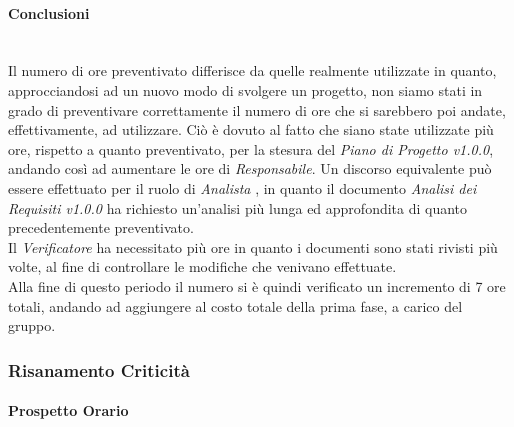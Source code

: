 \paragraph{Conclusioni} \-\\
Il numero di ore preventivato differisce da quelle realmente utilizzate in quanto, approcciandosi ad un nuovo modo di svolgere un progetto, non siamo stati in grado di preventivare correttamente il numero di ore che si sarebbero poi andate, effettivamente, ad utilizzare. Ciò è dovuto al fatto che siano state utilizzate più ore, rispetto a quanto preventivato, per la stesura del \textit{Piano di Progetto v1.0.0}, andando così ad aumentare le ore di \textit{Responsabile}. Un discorso equivalente può essere effettuato per il ruolo di \textit{Analista} , in quanto il documento \textit{Analisi dei Requisiti v1.0.0} ha richiesto un'analisi più lunga ed approfondita di quanto precedentemente preventivato. \\
Il \textit{Verificatore} ha necessitato più ore in quanto i documenti sono stati rivisti più volte, al fine di controllare le modifiche che venivano effettuate. \\
Alla fine di questo periodo il numero si è quindi verificato un incremento di 7 ore totali, andando ad aggiungere  al costo totale della prima fase, a carico del gruppo. 

\subsubsection{Risanamento Criticità}
\label{RA1}

\paragraph{Prospetto Orario} \-\\

